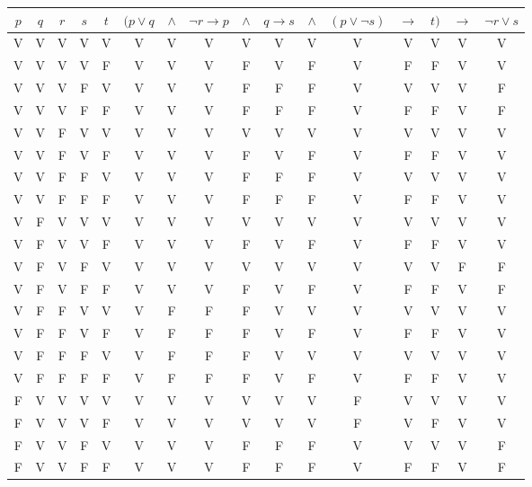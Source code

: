 \documentclass[paper=letter, fontsize=12pt]{scrartcl}
\begin{document}
\begin{center}
\begin{tabular}{|c|c|c|c|c|c|c|c|c|c|c|c|c|c|c|c|}
\hline
$p$ & $q$ & $r$ & $s$ & $t$ & $(p\vee q$ & $\wedge$ & $\neg r \rightarrow p$ & $\wedge$ & $q \rightarrow s$ & $\wedge$ & $(p \vee \neg s)$ & $\rightarrow$ & $t)$ & $\rightarrow $ & $\neg r \vee s$ \\\hline
V & V & V & V & V & V & V & V & V & V & V & V & V & V & V & V\\ \hline 
V & V & V & V & F & V & V & V & F & V & F & V & F & F & V & V\\ \hline
V & V & V & F & V & V & V & V & F & F & F & V & V & V & V & F\\ \hline
V & V & V & F & F & V & V & V & F & F & F & V & F & F & V & F\\ \hline
V & V & F & V & V & V & V & V & V & V & V & V & V & V & V & V\\ \hline
V & V & F & V & F & V & V & V & F & V & F & V & F & F & V & V\\ \hline
V & V & F & F & V & V & V & V & F & F & F & V & V & V & V & V\\ \hline
V & V & F & F & F & V & V & V & F & F & F & V & F & F & V & V\\ \hline
V & F & V & V & V & V & V & V & V & V & V & V & V & V & V & V\\ \hline
V & F & V & V & F & V & V & V & F & V & F & V & F & F & V & V\\ \hline
V & F & V & F & V & V & V & V & V & V & V & V & V & V & F & F\\ \hline
V & F & V & F & F & V & V & V & F & V & F & V & F & F & V & F\\ \hline
V & F & F & V & V & V & F & F & F & V & V & V & V & V & V & V\\ \hline
V & F & F & V & F & V & F & F & F & V & F & V & F & F & V & V\\ \hline
V & F & F & F & V & V & F & F & F & V & V & V & V & V & V & V\\ \hline
V & F & F & F & F & V & F & F & F & V & F & V & F & F & V & V\\ \hline
F & V & V & V & V & V & V & V & V & V & V & F & V & V & V & V\\ \hline
F & V & V & V & F & V & V & V & V & V & V & F & V & F & V & V\\ \hline
F & V & V & F & V & V & V & V & F & F & F & V & V & V & V & F\\ \hline
F & V & V & F & F & V & V & V & F & F & F & V & F & F & V & F\\ \hline

\end{tabular}
\end{center}
\end{document}

